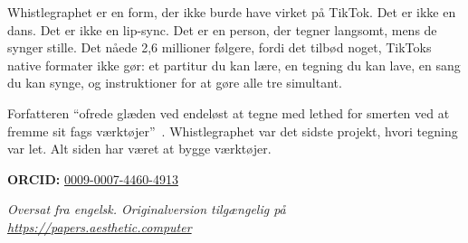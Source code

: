 \documentclass[10pt,letterpaper,twocolumn]{article}
\begin{document}
Whistlegraphet er en form, der ikke burde have virket på TikTok. Det er ikke en dans. Det er ikke en lip-sync. Det er en person, der tegner langsomt, mens de synger stille. Det nåede 2,6 millioner følgere, fordi det tilbød noget, TikToks native formater ikke gør: et partitur du kan lære, en tegning du kan lave, en sang du kan synge, og instruktioner for at gøre alle tre simultant.

Forfatteren ``ofrede glæden ved endeløst at tegne med lethed for smerten ved at fremme sit fags værktøjer''~\citep{scudder2019drawing}. Whistlegraphet var det sidste projekt, hvori tegning var let. Alt siden har været at bygge værktøjer.

\vspace{0.5em}
\noindent\textbf{ORCID:} \href{https://orcid.org/0009-0007-4460-4913}{0009-0007-4460-4913}

\vspace{0.5em}\noindent\textit{Oversat fra engelsk. Originalversion tilgængelig på \url{https://papers.aesthetic.computer}}



\end{document}
